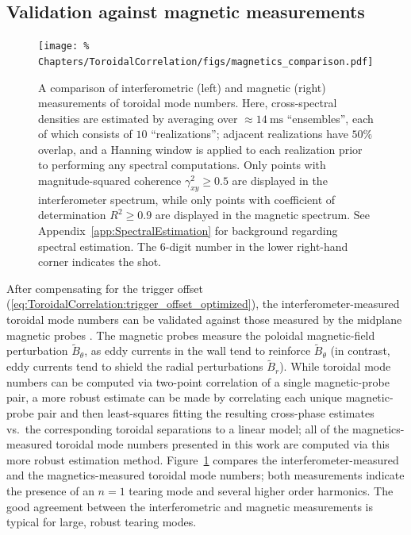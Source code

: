 \subsection{Validation against magnetic measurements}
\label{sec:ToroidalCorrelation:ImplementationDetails:validation_agains_magnetics}
\begin{figure}
  \centering
  \texttt{[image: \%
    Chapters/ToroidalCorrelation/figs/magnetics\_comparison.pdf]}
  \caption[Interferometric \& magnetic measurement of toroidal mode numbers]{%
    A comparison of interferometric (left) and magnetic (right)
    measurements of toroidal mode numbers.
    Here, cross-spectral densities are estimated
    by averaging over $\approx \SI{14}{\milli\second}$ ``ensembles'',
    each of which consists of $10$ ``realizations'';
    adjacent realizations have $50\%$ overlap, and
    a Hanning window is applied to each realization
    prior to performing any spectral computations.
    Only points with magnitude-squared coherence
    $\gamma_{xy}^2 \geq 0.5$ are displayed
    in the interferometer spectrum, while
    only points with coefficient of determination
    $R^2 \geq 0.9$ are displayed
    in the magnetic spectrum.
    See Appendix~\ref{app:SpectralEstimation}
    for background regarding spectral estimation.
    The $6$-digit number in the lower right-hand corner
    indicates the \diiid\space shot.
  }
\label{fig:ToroidalCorrelation:magnetics_comparison}
\end{figure}

After compensating for the trigger offset
(\ref{eq:ToroidalCorrelation:trigger_offset_optimized}),
the interferometer-measured toroidal mode numbers can be validated against
those measured by the \diiid\space midplane magnetic probes
\cite{strait_rsi06}.
The magnetic probes measure the
poloidal magnetic-field perturbation $\tilde{B}_{\theta}$,
as eddy currents in the wall tend to reinforce $\tilde{B}_{\theta}$
(in contrast, eddy currents tend to shield
the radial perturbations $\tilde{B}_{r}$).
While toroidal mode numbers can be computed
via two-point correlation of a single magnetic-probe pair,
a more robust estimate can be made
by correlating each unique magnetic-probe pair and
then least-squares fitting
the resulting cross-phase estimates vs.\
the corresponding toroidal separations to a linear model;
all of the magnetics-measured toroidal mode numbers
presented in this work
are computed via this more robust estimation method.
Figure~\ref{fig:ToroidalCorrelation:magnetics_comparison}
compares the interferometer-measured and the magnetics-measured
toroidal mode numbers;
both measurements indicate the presence of an $n = 1$ tearing mode and
several higher order harmonics.
The good agreement between the interferometric and magnetic measurements
is typical for large, robust tearing modes.


